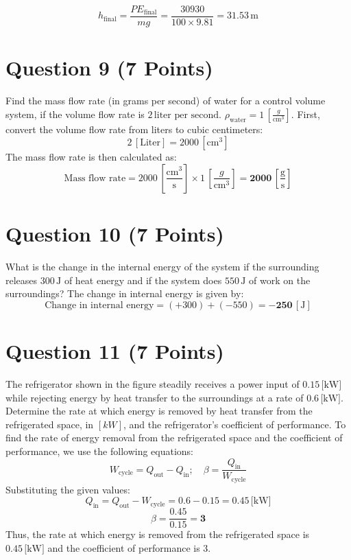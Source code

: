 \documentclass{article}
\begin{document}
\[
h_{\text{final}} = \frac{PE_{\text{final}}}{mg} = \frac{30930}{100 \times 9.81} = \mathbf{31.53} \, \text{m}
\]

\newpage
\section*{Question 9 (7 Points)}

Find the mass flow rate (in grams per second) of water for a control volume system, if the volume flow rate is \(2 \, \text{liter per second}\). \(\rho_{\text{water}}=1 \, \left[\frac{g}{\text{cm}^3}\right]\).
\newline
First, convert the volume flow rate from liters to cubic centimeters:
\[
2 \, \left[\text{Liter}\right] = 2000 \, \left[\text{cm}^3\right]
\]
\newline
The mass flow rate is then calculated as:
\[
\text{Mass flow rate} = 2000 \, \left[\frac{\text{cm}^3}{\text{s}}\right] \times 1 \, \left[\frac{g}{\text{cm}^3}\right] = \mathbf{2000} \, \left[\frac{\text{g}}{\text{s}}\right]
\]
\newpage
\section*{Question 10 (7 Points)}

What is the change in the internal energy of the system if the surrounding releases \(300 \, \text{J}\) of heat energy and if the system does \(550 \, \text{J}\) of work on the surroundings?
\newline
The change in internal energy is given by:
\[
\text{Change in internal energy} = \left(+300\right) + \left(-550\right) = -\mathbf{250} \, \left[\text{J}\right]
\]

\newpage
\section*{Question 11 (7 Points)}

The refrigerator shown in the figure steadily receives a power input of \(0.15 \, \text{[kW]}\) while rejecting energy by heat transfer to the surroundings at a rate of \(0.6 \, \text{[kW]}\). Determine the rate at which energy is removed by heat transfer from the refrigerated space, in \([kW]\), and the refrigerator's coefficient of performance.
\newline \newline
To find the rate of energy removal from the refrigerated space and the coefficient of performance, we use the following equations:
 \newline
\[
W_{\text{cycle}} = Q_{\text{out}} - Q_{\text{in}}; \quad \beta = \frac{Q_{\text{in}}}{W_{\text{cycle}}}
\]
 \newline
Substituting the given values:
 \newline
\[
Q_{\text{in}} = Q_{\text{out}} - W_{\text{cycle}} = 0.6 - 0.15 = \mathbf{0.45} \, \text{[kW]}
\]
\[
\beta = \frac{0.45}{0.15} = \mathbf{3}
\]
 \newline
Thus, the rate at which energy is removed from the refrigerated space is \(0.45 \, \text{[kW]}\) and the coefficient of performance is \(3\).
\end{document}
